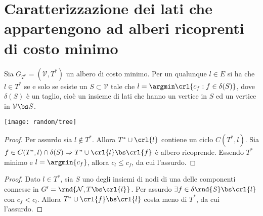 \documentclass[\main/main.tex]{subfiles}
\begin{document}
\section{Caratterizzazione dei lati che appartengono ad alberi ricoprenti di costo minimo}

\begin{minipage}{\textwidth}
  \begin{minipage}{.83\textwidth}
    \flushleft
    \begin{theorem}
      Sia $G_{T^*} = (\mathcal{V}, T^*)$ un albero di costo minimo. Per un qualunque $l \in E$ si ha che $l \in T^*$ se e solo se esiste un $S \subset \mathcal{V}$ tale che $l = \argmin\crl{c_f: f \in \delta(S)}$, dove $\delta(S)$ è un taglio, cioè un insieme di lati che hanno un vertice in $S$ ed un vertice in $\mathcal{V} \bs S$.
    \end{theorem}
  \end{minipage}\hfill
  \begin{minipage}{0.15\textwidth}\center
    \texttt{[image: random/tree]}
  \end{minipage}
\end{minipage}

\begin{proof}
  Per assurdo sia $l \not\in T^*$. Allora $T^* \cup \crl{l}$ contiene un ciclo $C(T^*, l)$. Sia $f \in C(T^*, l) \cap \delta(S) \Rightarrow T^* \cup \crl{l} \bs \crl{f}$ è albero ricoprende. Essendo $T^*$ minimo e $l = \argmin{c_f}$, allora $c_l \leq c_f$, da cui l'assurdo.
\end{proof}

\begin{proof}
  Dato $l \in T^*$, sia $S$ uno degli insiemi di nodi di una delle componenti connesse in $G' = \rnd{\mathcal{N}, T \bs \crl{l}}$. Per assurdo $\exists f \in \delta\rnd{S}\bs \crl{l}$ con $c_f < c_l$. Allora $T^*\cup \crl{f} \bs \crl{l}$ costa meno di $T^*$, da cui l'assurdo.
\end{proof}
\end{document}
